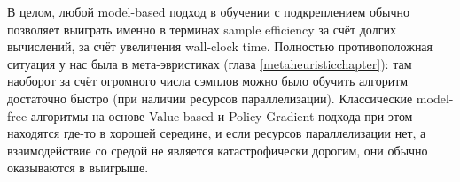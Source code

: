 
\begin{remark}
В целом, любой model-based подход в обучении с подкреплением обычно позволяет выиграть именно в терминах sample efficiency за счёт долгих вычислений, за счёт увеличения wall-clock time. Полностью противоположная ситуация у нас была в мета-эвристиках (глава \ref{metaheuristicchapter}): там наоборот за счёт огромного числа сэмплов можно было обучить алгоритм достаточно быстро (при наличии ресурсов параллелизации). Классические model-free алгоритмы на основе Value-based и Policy Gradient подхода при этом находятся где-то в хорошей середине, и если ресурсов параллелизации нет, а взаимодействие со средой не является катастрофически дорогим, они обычно оказываются в выигрыше.
\end{remark}